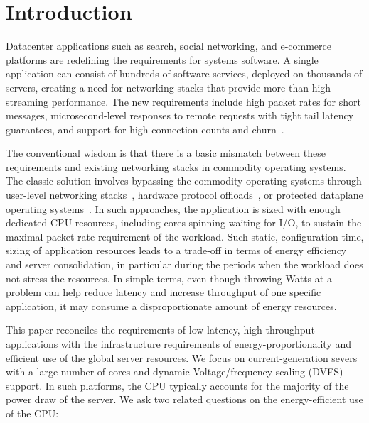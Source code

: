 
\section{Introduction}



Datacenter applications such as search, social networking, and
e-commerce platforms are redefining the requirements for systems
software. A single application can consist of hundreds of software
services, deployed on thousands of servers, creating a need for
networking stacks that provide more than high streaming performance.
The new requirements include high packet rates for short messages,
microsecond-level responses to remote requests with tight tail latency
guarantees, and support for high connection counts and
churn~\cite{Atikoglu:2012:WAL,DBLP:journals/cacm/DeanB13,DBLP:conf/nsdi/NishtalaFGKLLMPPSSTV13}.



The conventional wisdom is that there is a basic mismatch between
these requirements and existing networking stacks in commodity
operating systems.  The classic solution involves bypassing the
commodity operating systems through user-level networking
stacks~\cite{mtcp,DBLP:conf/cloud/KapoorPTVV12,sandstorm,openonload,DBLP:conf/sigcomm/ThekkathNML93},
hardware protocol
offloads~\cite{dragojevic14farm,DBLP:conf/icpp/JoseSLZHWIOWSP11,mitchell:rdma,DBLP:conf/sosp/OngaroRSOR11},
or protected dataplane operating systems~\cite{ix-osdi}.  In such
approaches, the application is sized with enough dedicated CPU
resources, including cores spinning waiting for I/O, to sustain the
maximal packet rate requirement of the workload.  Such static,
configuration-time, sizing of application resources leads to a
trade-off in terms of energy efficiency and server consolidation, in
particular during the periods when the workload does not stress the
resources.  In simple terms, even though throwing Watts at a problem
can help reduce latency and increase throughput of one specific
application, it may consume a disproportionate amount of energy
resources.


This paper reconciles the requirements of low-latency, high-throughput
applications with the infrastructure requirements of
energy-proportionality and efficient use of the global server
resources.  We focus on current-generation severs with a large number
of cores and dynamic-Voltage/frequency-scaling (DVFS) support.  In
such platforms, the CPU typically accounts for the majority of the
power draw of the server.  We ask two related questions on the
energy-efficient use of the CPU:

